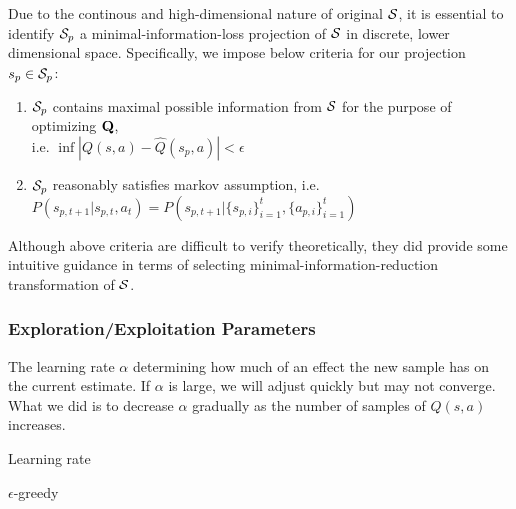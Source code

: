 \documentclass[11pt]{article}
\theoremstyle{definition}
\begin{document}
Due to the continous and high-dimensional nature of original ${\cal S}$, it is essential to identify ${\cal S}_p$ a minimal-information-loss projection of ${\cal S}$ in discrete, lower dimensional space. Specifically, we impose below criteria for our projection $s_p \in {\cal S}_p$:
\begin{enumerate}
\item ${\cal S}_p$ contains maximal possible information from ${\cal S}$ for the purpose of optimizing ${\bf Q}$, \\ i.e. $\inf |Q(s, a) - \hat{Q}(s_p, a)| < \epsilon$
\item ${\cal S}_p$ reasonably satisfies markov assumption, i.e. $P(s_{p,t+1}|s_{p,t}, a_{t}) = P(s_{p, t+1}| \{s_{p, i}\}_{i=1}^t, \{a_{p, i}\}_{i=1}^t )$
\end{enumerate}

Although above criteria are difficult to verify theoretically, they did provide some intuitive guidance in terms of selecting minimal-information-reduction transformation of ${\cal S}$.  




\subsubsection{\textbf{Exploration/Exploitation Parameters}}
The learning rate $\alpha$ determining how much of an effect the new sample has on the current estimate. If $\alpha$ is large, we will adjust quickly but may not converge. What we did is to decrease $\alpha$ gradually as the number of samples of $Q(s,a)$ increases.

Learning rate

$\epsilon$-greedy
\end{document}
